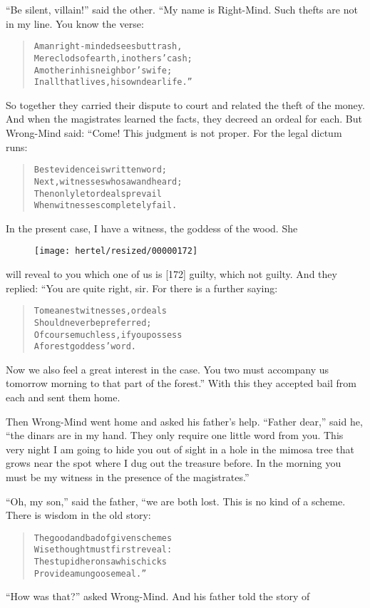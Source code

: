 \documentclass[article, twoside, 10pt]{memoir}
\renewenvironment{verbatim}{%
\begin{quote}%
\vskip -10pt%
\begin{alltt}\normalfont\small}{\end{alltt}%
\end{quote}%
\vskip -10pt
} %
\begin{document}
``Be silent, villain!'' said the other. “My name is Right-Mind.
Such thefts are not in my line. You know the verse:

\begin{verbatim}
A man right-minded sees but trash,
Mere clods of earth, in others' cash;
A mother in his neighbor's wife;
In all that lives, his own dear life.”
\end{verbatim}
So together they carried their dispute to court and related the
theft of the money. And when the magistrates learned the facts,
they decreed an ordeal for each. But Wrong-Mind said: “Come! This
judgment is not proper. For the legal dictum runs:

\begin{verbatim}
Best evidence is written word;
Next, witnesses who saw and heard;
Then only let ordeals prevail
When witnesses completely fail.
\end{verbatim}
In the present case, I have a witness, the goddess of the wood. She
\begin{figure}[p]\texttt{[image: hertel/resized/00000172]}\end{figure}will reveal to you which one of us is [172] guilty, which not
guilty. And they replied: “You are quite right, sir. For there is a
further saying:

\begin{verbatim}
To meanest witnesses, ordeals
    Should never be preferred;
Of course much less, if you possess
    A forest goddess' word.
\end{verbatim}
Now we also feel a great interest in the case. You two must
accompany us tomorrow morning to that part of the forest.” With
this they accepted bail from each and sent them home.

Then Wrong-Mind went home and asked his father's help.
``Father dear,'' said he,
``the dinars are in my hand. They only require one little word from you. This very night I am going to hide you out of sight in a hole in the mimosa tree that grows near the spot where I dug out the treasure before. In the morning you must be my witness in the presence of the magistrates.''

``Oh, my son,'' said the father, “we are both lost. This is no kind
of a scheme. There is wisdom in the old story:

\begin{verbatim}
The good and bad of given schemes
    Wise thought must first reveal:
The stupid heron saw his chicks
    Provide a mungoose meal.”
\end{verbatim}
``How was that?'' asked Wrong-Mind. And his father told the story
of
\end{document}
